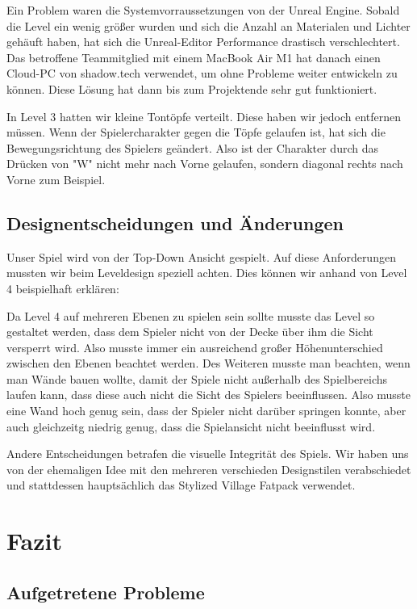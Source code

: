 \documentclass[oneside]{ausarbeitung}
\begin{document}
Ein Problem waren die Systemvorraussetzungen von der Unreal Engine. Sobald die Level ein wenig größer wurden und sich die Anzahl an Materialen und Lichter gehäuft haben, hat sich die Unreal-Editor Performance drastisch verschlechtert. Das betroffene Teammitglied mit einem MacBook Air M1 hat danach einen Cloud-PC von shadow.tech verwendet, um ohne Probleme weiter entwickeln zu können. Diese Lösung hat dann bis zum Projektende sehr gut funktioniert. 

In Level 3 hatten wir kleine Tontöpfe verteilt. Diese haben wir jedoch entfernen müssen. Wenn der Spielercharakter gegen die Töpfe gelaufen ist, hat sich die Bewegungsrichtung des Spielers geändert. Also ist der Charakter durch das Drücken von "W" nicht mehr nach Vorne gelaufen, sondern diagonal rechts nach Vorne zum Beispiel.



\section{Designentscheidungen und Änderungen}
\label{sec:designentscheidungenundänderungen}

Unser Spiel wird von der Top-Down Ansicht gespielt. Auf diese Anforderungen mussten wir beim Leveldesign speziell achten. Dies können wir anhand von Level 4 beispielhaft erklären:

Da Level 4 auf mehreren Ebenen zu spielen sein sollte musste das Level so gestaltet werden, dass dem Spieler nicht von der Decke über ihm die Sicht versperrt wird. Also musste immer ein ausreichend großer Höhenunterschied zwischen den Ebenen beachtet werden. Des Weiteren musste man beachten, wenn man Wände bauen wollte, damit der Spiele nicht außerhalb des Spielbereichs laufen kann, dass diese auch nicht die Sicht des Spielers beeinflussen. Also musste eine Wand hoch genug sein, dass der Spieler nicht darüber springen konnte, aber auch gleichzeitg niedrig genug, dass die Spielansicht nicht beeinflusst wird.

Andere Entscheidungen betrafen die visuelle Integrität des Spiels. Wir haben uns von der ehemaligen Idee mit den mehreren verschieden Designstilen verabschiedet und stattdessen hauptsächlich das Stylized Village Fatpack verwendet.


\chapter{Fazit}
\label{cha:fazit}

\section{Aufgetretene Probleme}
\label{sec:aufgetreteneprobleme}
\end{document}
